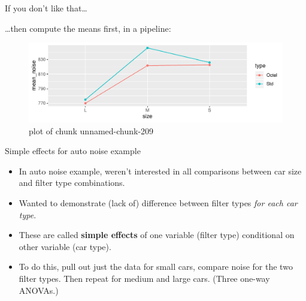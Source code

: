 \documentclass[ignorenonframetext,]{beamer}
\newenvironment{Shaded}{\begin{snugshade}}{\end{snugshade}}
\newcommand{\DataTypeTok}[1]{\textcolor[rgb]{0.13,0.29,0.53}{#1}}
\newcommand{\KeywordTok}[1]{\textcolor[rgb]{0.13,0.29,0.53}{\textbf{#1}}}
\newcommand{\NormalTok}[1]{#1}
\newcommand{\OperatorTok}[1]{\textcolor[rgb]{0.81,0.36,0.00}{\textbf{#1}}}
\newcommand{\StringTok}[1]{\textcolor[rgb]{0.31,0.60,0.02}{#1}}
\begin{document}
\begin{frame}[fragile]{If you don't like that\ldots}
\protect\hypertarget{if-you-dont-like-that}{}

\ldots then compute the means first, in a pipeline:

\footnotesize

\begin{Shaded}
\end{Shaded}

\begin{figure}
\centering
\includegraphics{figure/unnamed-chunk-209-1.pdf}
\caption{plot of chunk unnamed-chunk-209}
\end{figure}

\normalsize

\end{frame}

\begin{frame}{Simple effects for auto noise example}
\protect\hypertarget{simple-effects-for-auto-noise-example}{}

\begin{itemize}
\item
  In auto noise example, weren't interested in all comparisons between
  car size and filter type combinations.
\item
  Wanted to demonstrate (lack of) difference between filter types
  \emph{for each car type}.
\item
  These are called \textbf{simple effects} of one variable (filter type)
  conditional on other variable (car type).
\item
  To do this, pull out just the data for small cars, compare noise for
  the two filter types. Then repeat for medium and large cars. (Three
  one-way ANOVAs.)
\end{itemize}

\end{frame}
\end{document}
